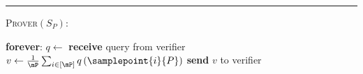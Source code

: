 \documentclass{toc}
\begin{document}
\begin{protocol}[H]
\begin{ShadedAlgorithmBox}
		
		\noindent\rule{\textwidth}{0.5pt}
		
		\vspace*{0.5em}
		
		\textsc{Prover}$(S_P)$:
		\begin{algorithmic}
			\vspace*{0.2em}
			\Loop \textbf{ forever}:
			\vspace*{0.2em}
			\State $q \gets$ \textbf{receive} query from verifier
			\vspace*{0.5em}
			\State $v \gets \frac{1}{\mP}\sum_{i \in [\mP]}q\left(\samplepoint{i}{P}\right)$
			\vspace*{0.5em}
			\State \textbf{send} $v$ to verifier
			\EndLoop 
		\end{algorithmic}
		
	\end{ShadedAlgorithmBox}
	
	\caption{A PAC verification protocol for statistical query algorithms.}
	\label{protocol:sq-verification}
\end{protocol}
\end{document}
